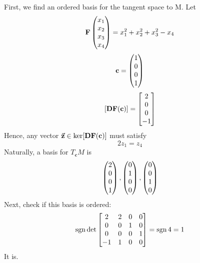 \documentclass{homework}
\DeclareMathOperator{\sgn}{sgn}
\begin{document}
\begin{problem}{12}
  First, we find an ordered basis for the tangent space to M. Let
  $$\mathbf{F} \begin{pmatrix}x_1 \\ x_2 \\ x_3 \\ x_4\end{pmatrix} = x_1^2 + x_2^2 + x_3^2 - x_4$$
  $$\mathbf{c} = \begin{pmatrix}1 \\ 0 \\ 0 \\ 1\end{pmatrix}$$
  $$[\mathbf{DF}(\mathbf{c})] = \begin{bmatrix}2 \\ 0 \\ 0 \\ -1\end{bmatrix}$$
  Hence, any vector $\vec{\mathbf{z}} \in \ker [\mathbf{DF}(\mathbf{c})]$ must satisfy
  $$2z_1 = z_4$$
  Naturally, a basis for $T_{\mathbf{c}}M$ is
  $$\begin{pmatrix}2 \\ 0 \\ 0 \\ 1\end{pmatrix},
    \begin{pmatrix}0 \\ 1 \\ 0 \\ 0\end{pmatrix},
    \begin{pmatrix}0 \\ 0 \\ 1 \\ 0\end{pmatrix}
  $$
  Next, check if this basis is ordered:
  $$\sgn \det
    \bmat{2 & 2 & 0 & 0 \\
          0 & 0 & 1 & 0 \\
          0 & 0 & 0 & 1 \\
         -1 & 1 & 0 & 0} = \sgn 4 = 1
  $$
  It is.
\end{problem}
\end{document}
